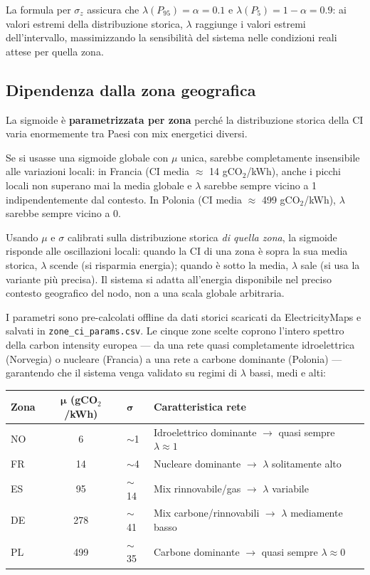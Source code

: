 \documentclass[a4paper,11pt]{article}
\begin{document}
La formula per $\sigma_z$ assicura che $\lambda(P_{95}) = \alpha = 0.1$ e
$\lambda(P_5) = 1 - \alpha = 0.9$: ai valori estremi della distribuzione storica,
$\lambda$ raggiunge i valori estremi dell'intervallo, massimizzando la sensibilità del
sistema nelle condizioni reali attese per quella zona.

\subsection{Dipendenza dalla zona geografica}

La sigmoide è \textbf{parametrizzata per zona} perché la distribuzione storica della CI
varia enormemente tra Paesi con mix energetici diversi.

Se si usasse una sigmoide globale con $\mu$ unica, sarebbe completamente insensibile
alle variazioni locali: in Francia (CI media $\approx$ 14 gCO$_2$/kWh), anche i picchi
locali non superano mai la media globale e $\lambda$ sarebbe sempre vicino a 1
indipendentemente dal contesto. In Polonia (CI media $\approx$ 499 gCO$_2$/kWh),
$\lambda$ sarebbe sempre vicino a 0.

Usando $\mu$ e $\sigma$ calibrati sulla distribuzione storica \textit{di quella zona},
la sigmoide risponde alle oscillazioni locali: quando la CI di una zona è sopra la sua
media storica, $\lambda$ scende (si risparmia energia); quando è sotto la media,
$\lambda$ sale (si usa la variante più precisa). Il sistema si adatta all'energia
disponibile nel preciso contesto geografico del nodo, non a una scala globale
arbitraria.

I parametri sono pre-calcolati offline da dati storici scaricati da ElectricityMaps e
salvati in \texttt{zone\_ci\_params.csv}. Le cinque zone scelte coprono l'intero spettro
della carbon intensity europea --- da una rete quasi completamente idroelettrica
(Norvegia) o nucleare (Francia) a una rete a carbone dominante (Polonia) ---
garantendo che il sistema venga validato su regimi di $\lambda$ bassi, medi e alti:

\begin{table}[h!]
\centering
\small
\begin{tabular}{lclp{6.5cm}}
\toprule
\textbf{Zona} & $\boldsymbol{\mu}$ \textbf{(gCO$_2$/kWh)} &
$\boldsymbol{\sigma}$ & \textbf{Caratteristica rete} \\
\midrule
NO & 6   & $\sim$1  & Idroelettrico dominante $\rightarrow$ quasi sempre $\lambda \approx 1$ \\
FR & 14  & $\sim$4  & Nucleare dominante $\rightarrow$ $\lambda$ solitamente alto \\
ES & 95  & $\sim$14 & Mix rinnovabile/gas $\rightarrow$ $\lambda$ variabile \\
DE & 278 & $\sim$41 & Mix carbone/rinnovabili $\rightarrow$ $\lambda$ mediamente basso \\
PL & 499 & $\sim$35 & Carbone dominante $\rightarrow$ quasi sempre $\lambda \approx 0$ \\
\bottomrule
\end{tabular}
\end{table}
\end{document}
